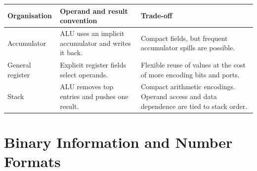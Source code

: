 \documentclass[12pt,a4paper]{article}
\begin{document}
\par\vspace{6pt}\noindent
\begin{tabularx}{\linewidth}{|B{3.2cm}|Y|Y|}\hline
Organisation & Operand and result convention & Trade-off \\ \hline
Accumulator & ALU uses an implicit accumulator and writes it back. & Compact fields, but frequent accumulator spills are possible. \\ \hline
General register & Explicit register fields select operands. & Flexible reuse of values at the cost of more encoding bits and ports. \\ \hline
Stack & ALU removes top entries and pushes one result. & Compact arithmetic encodings. Operand access and data dependence are tied to stack order. \\ \hline
\end{tabularx}

\section{Binary Information and Number Formats}
\end{document}
